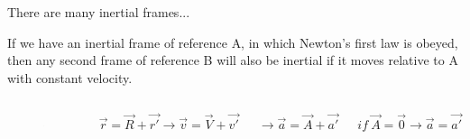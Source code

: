 \documentclass[]{beamer}
\begin{document}
\begin{frame}

  There are many inertial frames...


  \vspace{5mm}
  \pause

  If we have an inertial frame  of reference A, in which Newton’s first law is obeyed, then any second frame
  of reference B will also be inertial if it moves relative to A with constant   velocity.

  \begin{columns}[c]
    \column{2in}  %
       
    \begin{figure}[h!]  
      \includegraphics[width=1.2\textwidth]{images/f10.jpg}
     
    \end{figure}

    \column{2in}
 
    \begin{equation*}
      \vec{r}=\vec{R}+\vec{r'}\rightarrow \vec{v}=\vec{V}+\vec{v'}
    \end{equation*}

    \begin{equation*}
    \rightarrow \vec{a}=\vec{A}+\vec{a'}
    \end{equation*}


    
    \begin{equation*}
     if~\vec{A}=\vec{0}\rightarrow \vec{a}=\vec{a'}
      \end{equation*}

  
    \end{columns}
 


     \end{frame}
\end{document}
